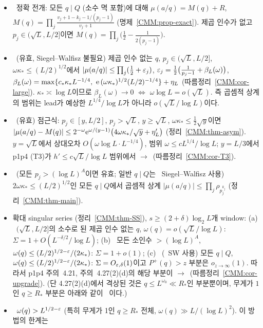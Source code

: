 \begin{itemize}[leftmargin=1.5em]
\item \PROVED\ 정확 전개: 모든 $q\mid Q$ (소수 멱 포함)에 대해 $\mu(a/q)=M(q)+R$,
 $M(q)=\prod_j \frac{v_j+1-k_j-1/(p_j-1)}{v_j+1}$ (명제~\ref{CMM:prop-exact}). 제곱 인수가 없고 $p_j\in(\sqrt L,L/2]$이면
 $M(q)=\prod_j\bigl(\tfrac12-\tfrac1{2(p_j-1)}\bigr)$.
\item \PROVED\ (유효, Siegel--Walfisz 불필요) 제곱 인수 없는 $q$, $p_j\in(\sqrt L,L/2]$, $\omega\kappa_*\le (L/2)^{1/2}$에서
 $|\mu(a/q)|\le\prod_j(\tfrac12+\varepsilon_j)$, $\varepsilon_j=\tfrac12\bigl(\tfrac1{p_j-1}+\beta_L(\omega)\bigr)$,
 $\beta_L(\omega)=\max\{c_*\kappa_*L^{-1/4},\ \e\,(\omega\kappa_*)^{1/2}(L/2)^{-1/4}\}+\eta_L$ (따름정리~\ref{CMM:cor-large}).
 $\kappa_*\asymp\log L$이므로 $\beta_L(\omega)\to0$ $\iff$ $\omega\log L=o(\sqrt L)$. 즉 곱셈적 상계의 범위는
 lead가 예상한 $L^{1/4}/\log L$가 아니라 $o(\sqrt L/\log L)$이다.
\item \PROVED\ (유효) 점근식: $p_j\in[y,L/2]$, $p_j>\sqrt L$, $y\ge\sqrt L$, $\omega\kappa_*\le\frac12\sqrt y$이면
 $|\mu(a/q)-M(q)|\le 2^{-\omega}\mathrm{e}^{\omega/(y-1)}\bigl(4\omega\kappa_*/\sqrt y+\eta'_L\bigr)$ (정리~\ref{CMM:thm-asym}).
 $y=\sqrt L$에서 상대오차 $O(\omega\log L\cdot L^{-1/4})$, 범위 $\omega\le cL^{1/4}/\log L$;
 $y=L/3$에서 p1p4 (T3)가 $h'\le c\sqrt L/\log L$ 범위에서 \HEUR$\to$\PROVED\ (따름정리~\ref{CMM:cor-T3}).
\item \PROVED\ (모든 $p_j>(\log L)^A$이면 유효; 일반 $q\mid Q$는 \EXT\ Siegel--Walfisz 사용)
 $2\omega\kappa_*\le(L/2)^{1/2}$인 모든 $q\mid Q$에서 곱셈적 상계 $|\mu(a/q)|\le\prod_j \rho_{p_j^{k_j}}$ (정리~\ref{CMM:thm-main}).
\item 확대 singular series (정리~\ref{CMM:thm-SS}), $s\ge(2+\delta)\log_2 L$개 window:
 (a) \PROVED\ $(\sqrt L,L/2]$의 소수로 된 제곱 인수 없는 $q$, $\omega(q)=o(\sqrt L/\log L)$: $\Sigma=1+O(L^{-\delta/2}/\log L)$;
 (b) \PROVED\ 모든 소인수 $>(\log L)^A$, $\omega(q)\le(L/2)^{1/2-\varepsilon}/(2\kappa_*)$: $\Sigma=1+o(1)$;
 (c) \PROVED\ (\EXT\ SW 사용) 모든 $q\mid Q$, $\omega(q)\le(L/2)^{1/2-\varepsilon}/(2\kappa_*)$: $\Sigma=O_{\varepsilon,\delta}(1)$이고 $P^+(q)>z$ 부분은 $o_{z\to\infty}(1)$.
 따라서 p1p4 주의~4.21, 주의~4.27(2)(d)의 해당 부분이 \HEUR$\to$\PROVED\ (따름정리~\ref{CMM:cor-upgrade}).
 (단 4.27(2)(d)에서 격상된 것은 $q\le L^{\omega_0}\ll R_*$인 부분뿐이며, 무게가 $1$인 $q\ge R_*$ 부분은 아래와 같이 \OPEN\ 이다.)
\item \OPEN\ $\omega(q)>L^{1/2-\varepsilon}$ (특히 무게가 1인 $q\ge R_*$ 전체, $\omega(q)\gg L/(\log L)^2$). 이 방법의 한계는

\end{itemize}
